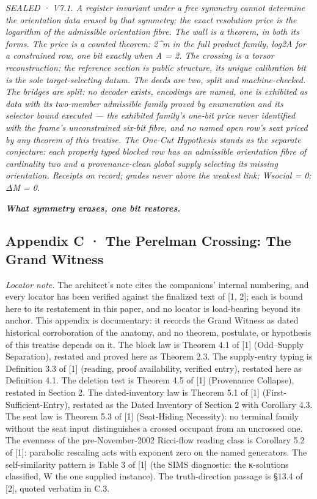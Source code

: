 \documentclass[10pt]{article}
\renewcommand{\_}{\origunderscore\allowbreak}
\begin{document}
\emph{SEALED · V7.1. A register invariant under a free symmetry cannot
determine the orientation data erased by that symmetry; the exact
resolution price is the logarithm of the admissible orientation fibre.
The wall is a theorem, in both its forms. The price is a counted
theorem: 2\^{}m in the full product family, log2\textbar A\textbar{} for
a constrained row, one bit exactly when \textbar A\textbar{} = 2. The
crossing is a torsor reconstruction: the reference section is public
structure, its unique calibration bit is the sole target-selecting
datum. The deeds are two, split and machine-checked. The bridges are
split: no decoder exists, encodings are named, one is exhibited as data
with its two-member admissible family proved by enumeration and its
selector bound executed --- the exhibited family's one-bit price never
identified with the frame's unconstrained six-bit fibre, and no named
open row's seat priced by any theorem of this treatise. The One-Cut
Hypothesis stands as the separate conjecture: each properly typed
blocked row has an admissible orientation fibre of cardinality two and a
provenance-clean global supply selecting its missing orientation.
Receipts on record; grades never above the weakest link; W\_social = 0;
ΔM = 0.}

\textbf{\emph{What symmetry erases, one bit restores.}}

\hypertarget{appendix-c-the-perelman-crossing-the-grand-witness}{%
\subsection{Appendix C · The Perelman Crossing: The Grand
Witness}\label{appendix-c-the-perelman-crossing-the-grand-witness}}

\emph{Locator note.} The architect's note cites the companions' internal
numbering, and every locator has been verified against the finalized
text of {[}1, 2{]}; each is bound here to its restatement in this paper,
and no locator is load-bearing beyond its anchor. This appendix is
documentary: it records the Grand Witness as dated historical
corroboration of the anatomy, and no theorem, postulate, or hypothesis
of this treatise depends on it. The block law is Theorem 4.1 of {[}1{]}
(Odd--Supply Separation), restated and proved here as Theorem 2.3. The
supply-entry typing is Definition 3.3 of {[}1{]} (reading, proof
availability, verified entry), restated here as Definition 4.1. The
deletion test is Theorem 4.5 of {[}1{]} (Provenance Collapse), restated
in Section 2. The dated-inventory law is Theorem 5.1 of {[}1{]}
(First-Sufficient-Entry), restated as the Dated Inventory of Section 2
with Corollary 4.3. The seat law is Theorem 5.3 of {[}1{]} (Seat-Hiding
Necessity): no terminal family without the seat input distinguishes a
crossed occupant from an uncrossed one. The evenness of the
pre-November-2002 Ricci-flow reading class is Corollary 5.2 of {[}1{]}:
parabolic rescaling acts with exponent zero on the named generators. The
self-similarity pattern is Table 3 of {[}1{]} (the SIMS diagnostic: the
κ-solutions classified, W the one supplied instance). The
truth-direction passage is §13.4 of {[}2{]}, quoted verbatim in C.3.
\end{document}
